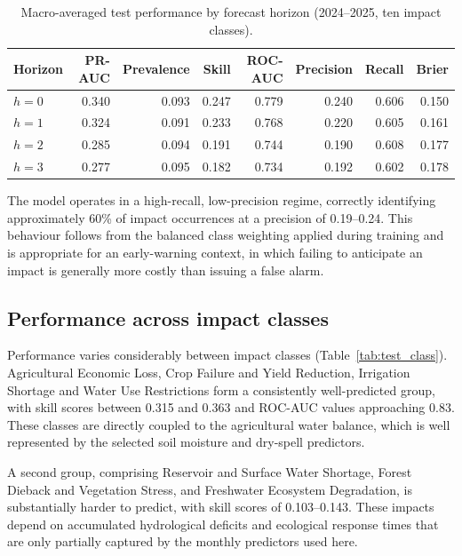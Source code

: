 \begin{table}[h]
\centering
\small
\caption{Macro-averaged test performance by forecast horizon (2024--2025, ten impact classes).}
\label{tab:test_horizon}
\begin{tabular}{lrrrrrrr}
\toprule
\textbf{Horizon} & \textbf{PR-AUC} & \textbf{Prevalence} & \textbf{Skill} & \textbf{ROC-AUC} & \textbf{Precision} & \textbf{Recall} & \textbf{Brier} \\
\midrule
$h=0$ & 0.340 & 0.093 & 0.247 & 0.779 & 0.240 & 0.606 & 0.150 \\
$h=1$ & 0.324 & 0.091 & 0.233 & 0.768 & 0.220 & 0.605 & 0.161 \\
$h=2$ & 0.285 & 0.094 & 0.191 & 0.744 & 0.190 & 0.608 & 0.177 \\
$h=3$ & 0.277 & 0.095 & 0.182 & 0.734 & 0.192 & 0.602 & 0.178 \\
\bottomrule
\end{tabular}
\end{table}

The model operates in a high-recall, low-precision regime, correctly
identifying approximately 60\% of impact occurrences at a precision of
0.19--0.24. This behaviour follows from the balanced class weighting applied
during training and is appropriate for an early-warning context, in which
failing to anticipate an impact is generally more costly than issuing a false
alarm.

\subsection{Performance across impact classes}

Performance varies considerably between impact classes
(Table~\ref{tab:test_class}). Agricultural Economic Loss, Crop Failure and
Yield Reduction, Irrigation Shortage and Water Use Restrictions form a
consistently well-predicted group, with skill scores between 0.315 and 0.363
and ROC-AUC values approaching 0.83. These classes are directly coupled to the
agricultural water balance, which is well represented by the selected soil
moisture and dry-spell predictors.

A second group, comprising Reservoir and Surface Water Shortage, Forest Dieback
and Vegetation Stress, and Freshwater Ecosystem Degradation, is substantially
harder to predict, with skill scores of 0.103--0.143. These impacts depend on
accumulated hydrological deficits and ecological response times that are only
partially captured by the monthly predictors used here.

